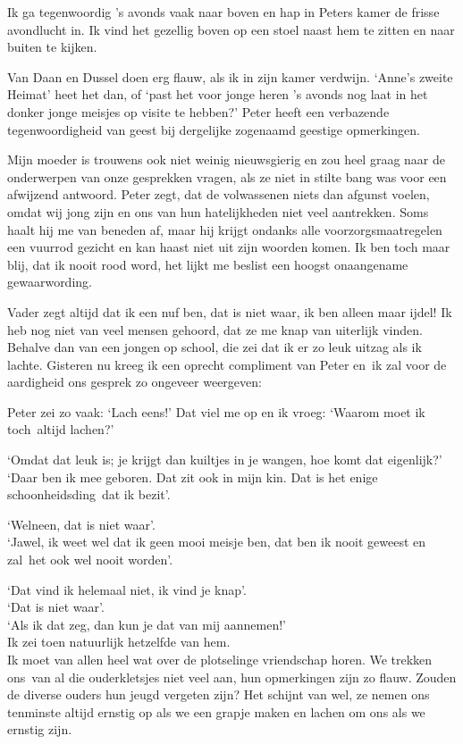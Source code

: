 \documentclass{book}
\begin{document}
Ik ga tegenwoordig 's avonds vaak naar boven en hap in Peters kamer de frisse
avondlucht in. Ik vind het gezellig boven op een stoel naast hem te zitten en
naar buiten te kijken.

Van Daan en Dussel doen erg flauw, als ik in zijn kamer verdwijn. `Anne's zweite
Heimat' heet het dan, of `past het voor jonge heren 's avonds nog laat in het
donker jonge meisjes op visite te hebben?' Peter heeft een verbazende
tegenwoordigheid van geest bij dergelijke zogenaamd geestige opmerkingen.

Mijn moeder is trouwens ook niet weinig nieuwsgierig en zou heel graag naar de
onderwerpen van onze gesprekken vragen, als ze niet in stilte bang was voor een
afwijzend antwoord. Peter zegt, dat de volwassenen niets dan afgunst voelen,
omdat wij jong zijn en ons van hun hatelijkheden niet veel aantrekken. Soms
haalt hij me van beneden af, maar hij krijgt ondanks alle voorzorgsmaatregelen
een vuurrod gezicht en kan haast niet uit zijn woorden komen. Ik ben toch maar
blij, dat ik nooit rood word, het lijkt me beslist een hoogst onaangename
gewaarwording.

Vader zegt altijd dat ik een nuf ben, dat is niet waar, ik ben alleen maar
ijdel! Ik heb nog niet van veel mensen gehoord, dat ze me knap van uiterlijk
vinden. Behalve dan van een jongen op school, die zei dat ik er zo leuk uitzag
als ik lachte. Gisteren nu kreeg ik een oprecht compliment van Peter en~ik zal
voor de aardigheid ons gesprek zo ongeveer weergeven:

Peter zei zo vaak: `Lach eens!' Dat viel me op en ik vroeg: `Waarom moet ik
toch~altijd lachen?'

`Omdat dat leuk is; je krijgt dan kuiltjes in je wangen, hoe komt dat
eigenlijk?' `Daar ben ik mee geboren. Dat zit ook in mijn kin. Dat is het enige
schoonheidsding~dat ik bezit'.

`Welneen, dat is niet waar'.\\
`Jawel, ik weet wel dat ik geen mooi meisje ben,
dat ben ik nooit geweest en zal~het ook wel nooit worden'.

`Dat vind ik helemaal niet, ik vind je knap'.\\
`Dat is niet waar'.\\
`Als ik
dat zeg, dan kun je dat van mij aannemen!'\\
Ik zei toen natuurlijk hetzelfde
van hem.\\
Ik moet van allen heel wat over de plotselinge vriendschap horen. We
trekken ons~van al die ouderkletsjes niet veel aan, hun opmerkingen zijn zo
flauw. Zouden de diverse ouders hun jeugd vergeten zijn? Het schijnt van wel, ze
nemen ons tenminste altijd ernstig op als we een grapje maken en lachen om ons
als we ernstig zijn.
\end{document}
